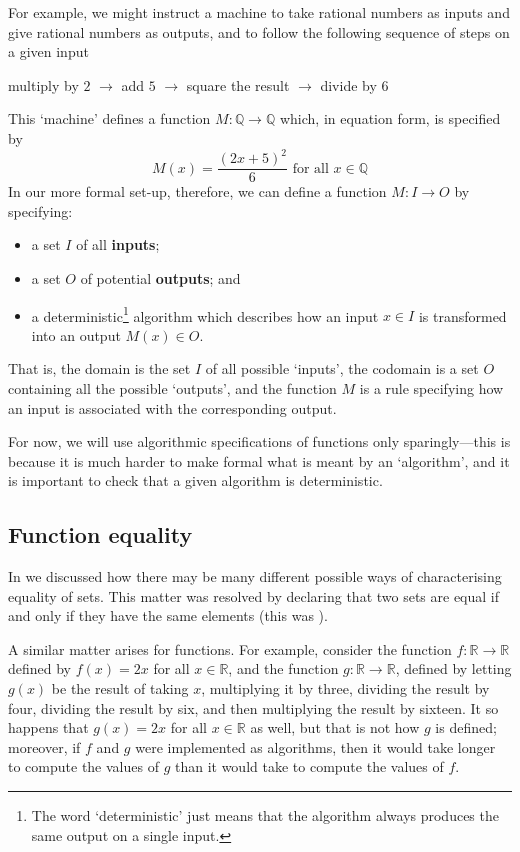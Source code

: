 For example, we might instruct a machine to take rational numbers as inputs and give rational numbers as outputs, and to follow the following sequence of steps on a given input
\begin{center}
\label{txtAlgorithmicallyDefinedFunctionExample}
multiply by $2$ $\to$ add $5$ $\to$ square the result $\to$ divide by $6$
\end{center}
This `machine' defines a function $M : \mathbb{Q} \to \mathbb{Q}$ which, in equation form, is specified by
\[ M(x) = \frac{(2x+5)^2}{6} \text{ for all } x \in \mathbb{Q} \]
In our more formal set-up, therefore, we can define a function $M : I \to O$ by specifying:
\begin{itemize}
\item a set $I$ of all \textbf{inputs};
\item a set $O$ of potential \textbf{outputs}; and
\item a deterministic\footnote{The word `deterministic' just means that the algorithm always produces the same output on a single input.} algorithm which describes how an input $x \in I$ is transformed into an output $M(x) \in O$.
\end{itemize}
That is, the domain is the set $I$ of all possible `inputs', the codomain is a set $O$ containing all the possible `outputs', and the function $M$ is a rule specifying how an input is associated with the corresponding output.

For now, we will use algorithmic specifications of functions only sparingly---this is because it is much harder to make formal what is meant by an `algorithm', and it is important to check that a given algorithm is deterministic.

\subsection*{Function equality}

In  we discussed how there may be many different possible ways of characterising equality of sets. This matter was resolved by declaring that two sets are equal if and only if they have the same elements (this was ).

A similar matter arises for functions. For example, consider the function $f : \mathbb{R} \to \mathbb{R}$ defined by $f(x) = 2x$ for all $x \in \mathbb{R}$, and the function $g : \mathbb{R} \to \mathbb{R}$, defined by letting $g(x)$ be the result of taking $x$, multiplying it by three, dividing the result by four, dividing the result by six, and then multiplying the result by sixteen. It so happens that $g(x) = 2x$ for all $x \in \mathbb{R}$ as well, but that is not how $g$ is defined; moreover, if $f$ and $g$ were implemented as algorithms, then it would take longer to compute the values of $g$ than it would take to compute the values of $f$.

